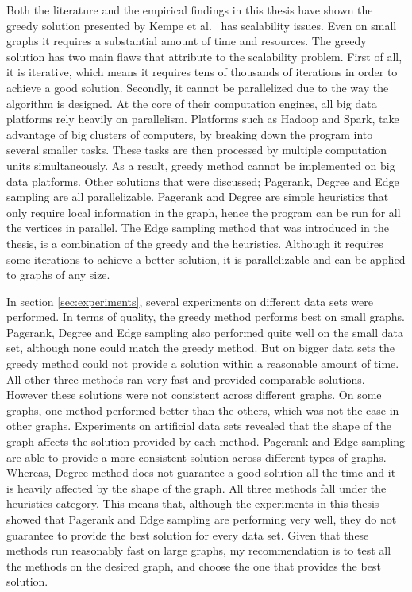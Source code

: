 \documentclass[english]{tktltiki}
\begin{document}
Both the literature and the empirical findings in this thesis have shown the greedy solution presented by Kempe et al.\ \cite{kempe03} has scalability issues. 
Even on small graphs it requires a substantial amount of time and resources.
The greedy solution has two main flaws that attribute to the scalability problem. 
First of all, it is iterative, which means it requires tens of thousands of iterations in order to achieve a good solution.
Secondly, it cannot be parallelized due to the way the algorithm is designed.
At the core of their computation engines, all big data platforms rely heavily on parallelism.
Platforms such as Hadoop and Spark, take advantage of big clusters of computers, by breaking down the program into several smaller tasks.
These tasks are then processed by multiple computation units simultaneously.
As a result, greedy method cannot be implemented on big data platforms.
Other solutions that were discussed; Pagerank, Degree and Edge sampling are all parallelizable.
Pagerank and Degree are simple heuristics that only require local information in the graph, hence the program can be run for all the vertices in parallel.
The Edge sampling method that was introduced in the thesis, is a combination of the greedy and the heuristics.
Although it requires some iterations to achieve a better solution, it is parallelizable and can be applied to graphs of any size.

In section \ref{sec:experiments}, several experiments on different data sets were performed.
In terms of quality, the greedy method performs best on small graphs. 
Pagerank, Degree and Edge sampling also performed quite well on the small data set, although none could match the greedy method.
But on bigger data sets the greedy method could not provide a solution within a reasonable amount of time.
All other three methods ran very fast and provided comparable solutions.
However these solutions were not consistent across different graphs.
On some graphs, one method performed better than the others, which was not the case in other graphs.
Experiments on artificial data sets revealed that the shape of the graph affects the solution provided by each method.
Pagerank and Edge sampling are able to provide a more consistent solution across different types of graphs.
Whereas, Degree method does not guarantee a good solution all the time and it is heavily affected by the shape of the graph.
All three methods fall under the heuristics category. 
This means that, although the experiments in this thesis showed that Pagerank and Edge sampling are performing very well, they do not guarantee to provide the best solution for every data set. 
Given that these methods run reasonably fast on large graphs, my recommendation is to test all the methods on the desired graph, and choose the one that provides the best solution.
\end{document}
